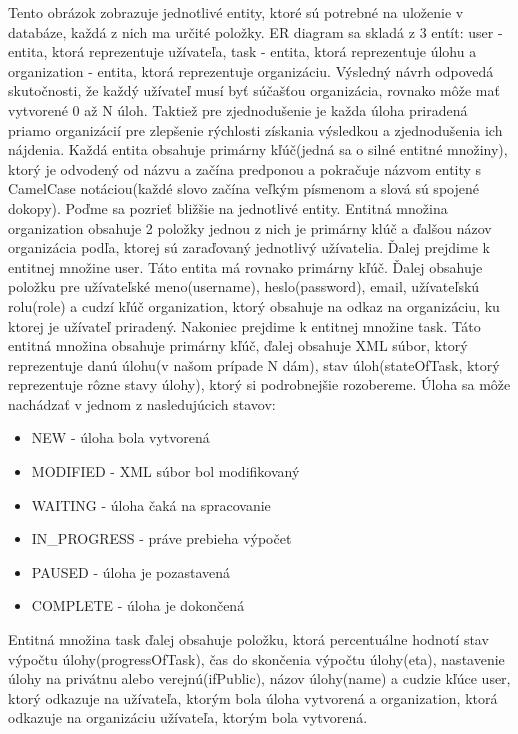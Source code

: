 Tento obrázok zobrazuje jednotlivé entity, ktoré sú potrebné na uloženie v databáze, každá z nich ma určité položky. ER diagram sa skladá z 3 entít: user - entita, ktorá reprezentuje užívateľa, task - entita, ktorá reprezentuje úlohu a organization - entita, ktorá reprezentuje organizáciu. Výsledný návrh odpovedá skutočnosti, že každý užívateľ musí byť súčašťou organizácia, rovnako môže mať vytvorené 0 až N úloh. Taktiež pre zjednodušenie je každa úloha priradená priamo organizácií pre zlepšenie rýchlosti získania výsledkou a zjednodušenia ich nájdenia. Každá entita obsahuje primárny kľúč(jedná sa o silné entitné množiny), ktorý je odvodený od názvu a začína predponou  a pokračuje názvom entity s CamelCase notáciou(každé slovo začína veľkým písmenom a slová sú spojené dokopy). Poďme sa pozrieť bližšie na jednotlivé entity. Entitná množina organization obsahuje 2 položky jednou z nich je primárny klúč a ďalšou názov organizácia podľa, ktorej sú zaraďovaný jednotlivý užívatelia. Ďalej prejdime k entitnej množine user. Táto entita má rovnako primárny kľúč. Ďalej obsahuje položku pre užívateľské meno(username), heslo(password), email, užívateľskú rolu(role) a cudzí kľúč organization, ktorý obsahuje na odkaz na organizáciu, ku ktorej je užívateľ priradený. Nakoniec prejdime k entitnej množine task. Táto entitná množina obsahuje primárny kľúč, ďalej obsahuje XML súbor, ktorý reprezentuje danú úlohu(v našom prípade N dám), stav úloh(stateOfTask, ktorý reprezentuje rôzne stavy úlohy), ktorý si podrobnejšie rozobereme. Úloha sa môže nachádzať v jednom z nasledujúcich stavov:
\begin{itemize}
\item NEW - úloha bola vytvorená
\item MODIFIED - XML súbor bol modifikovaný
\item WAITING - úloha čaká na spracovanie
\item IN\_PROGRESS - práve prebieha výpočet
\item PAUSED - úloha je pozastavená
\item COMPLETE - úloha je dokončená
\end{itemize}
Entitná množina task ďalej obsahuje položku, ktorá percentuálne hodnotí stav výpočtu úlohy(progressOfTask), čas do skončenia výpočtu úlohy(eta), nastavenie úlohy na privátnu alebo verejnú(ifPublic), názov úlohy(name) a cudzie kľúce user, ktorý odkazuje na užívateľa, ktorým bola úloha vytvorená a organization, ktorá odkazuje na organizáciu užívateľa, ktorým bola vytvorená. 

